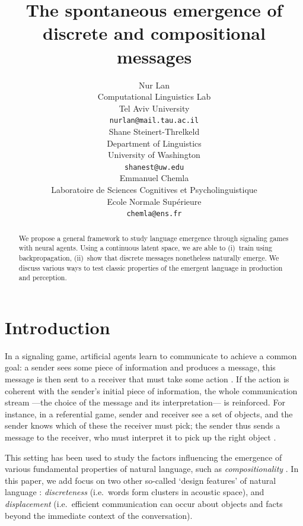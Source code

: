 \documentclass[11pt,a4paper]{article}
\title{The spontaneous emergence of discrete and compositional messages
	\\ \nbSST{(1) Thoughts on the title? (2) It's hidden on submission, but we need to decide author order as well.}
}
\author{Nur Lan \\
  Computational Linguistics Lab \\
  Tel Aviv University \\
  \texttt{nurlan@mail.tau.ac.il} \\\And
  Shane Steinert-Threlkeld \\
  Department of Linguistics \\
  University of Washington \\
  \texttt{shanest@uw.edu} \\\And
  Emmanuel Chemla \\
  Laboratoire de Sciences Cognitives et Psycholinguistique \\
  Ecole Normale Sup\'erieure \\
  \texttt{chemla@ens.fr}}
\date{}
\begin{document}
\maketitle

\begin{abstract}
	We propose a general framework to study language emergence through signaling games with neural agents. Using a continuous latent space, we are able to (i)~train using backpropagation, (ii)~show that discrete messages nonetheless naturally emerge. We discuss various ways to test classic properties of the emergent language in production and perception.
\end{abstract}

\section{Introduction}

In a signaling game, artificial agents learn to communicate to achieve a common goal: a sender sees some piece of information and produces a message, this message is then sent to a receiver that must take some action \citep{Lewis1969, Skyrms2010}. If the action is coherent with the sender's initial piece of information, the whole communication stream ---the choice of the message and its interpretation--- is reinforced. 
For instance, in a referential game, sender and receiver see a set of objects, and the sender knows which of these the receiver must pick; the sender thus sends a message to the receiver, who must interpret it to pick up the right object \citep{Lazaridou2017, Lazaridou2018, Havrylov2017, Chaabouni2019a}.

This setting has been used to study the factors influencing the emergence of various fundamental properties of natural language, such as \emph{compositionality} \citep{Kirby2015, Franke2016, SteinertThrelkeld2016, Mordatch2018, Lazaridou2018, Choi2018}.
In this paper, we add focus on two other so-called `design features' of natural language \citep{Hockett1960}: 
\emph{discreteness} (i.e.~words form clusters in acoustic space), 
and \emph{displacement} (i.e.~efficient communication can occur about objects and facts beyond the immediate context of the conversation).
\end{document}
